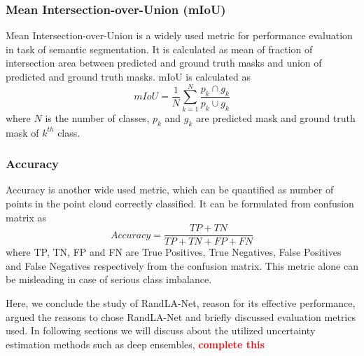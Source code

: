 \subsubsection{Mean Intersection-over-Union (mIoU)}
Mean Intersection-over-Union is a widely used metric for performance evaluation in task of semantic segmentation.
It is calculated as mean of fraction of intersection area between predicted and ground truth masks and union of predicted and ground truth masks.
mIoU is calculated as
$$mIoU=\frac{1}{N}\sum_{k=1}^N \frac{p_k\cap g_k}{p_k \cup g_k}$$
where $N$ is the number of classes, $p_k$ and $g_k$ are predicted mask and ground truth mask of $k^{th}$ class.

\subsubsection{Accuracy}
Accuracy is another wide used metric, which can be quantified as number of points in the point cloud correctly classified.
It can be formulated from confusion matrix as
$$Accuracy = \frac{TP+TN}{TP+TN+FP+FN}$$
where TP, TN, FP and FN are True Positives, True Negatives, False Positives and False Negatives respectively from the confusion matrix.
This metric alone can be misleading in case of serious class imbalance.

Here, we conclude the study of RandLA-Net, reason for its effective performance, argued the reasons to chose RandLA-Net and briefly discussed evaluation metrics used.
In following sections we will discuss about the utilized uncertainty estimation methods such as deep ensembles, \textcolor{red}{\textbf{complete this}}


